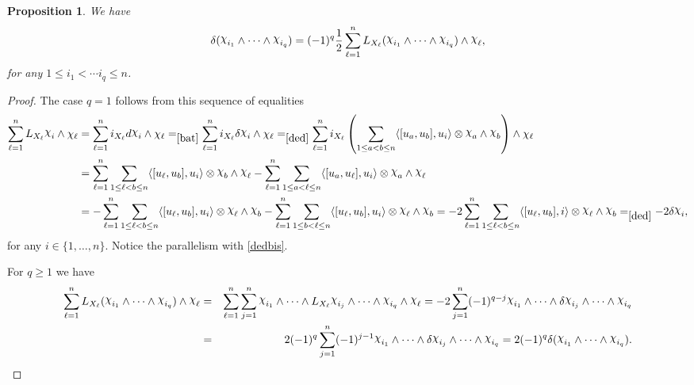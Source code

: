 \documentclass[a4paper,oneside,10pt,reqno]{amsart}
\newtheorem{proposition}[theorem]{Proposition}
\theoremstyle{definition}
\newcommand\chii{\raise2pt\hbox{$\chi$}}
\begin{document}
\begin{proposition}\label{sei}
We have
\begin{equation}\label{seib}
\delta(\chii_{i_1} \wedge \cdots \wedge \chii_{i_q})
 =    (-1)^{q}  \frac {1}  2  \sum_{\ell=1} ^n L_{X_\ell}( \chii_{i_1} \wedge \cdots \wedge \chii_{i_q} ) \wedge \chii_\ell  ,
 \end{equation}
for any $1 \leq i_1 < \cdots i_q \leq n$.
\end{proposition}
\begin{proof}
The case $q=1$ follows from this sequence of equalities
\begin{align*}
\sum_{\ell=1}^n L_{X_{\ell}} \chii_{i}\wedge \chi_{\ell} &=
\sum_{\ell=1}^n i_{X_{\ell}}  d \chii_{i}\wedge \chi_{\ell}=_{\eqref{bat}}
 \sum_{\ell=1}^n i_{X_{\ell}}  \delta \chii_{i}\wedge \chi_{\ell}
=_{\eqref{ded}}
\sum_{\ell=1}^n i_{X_{\ell}}   \left(\sum_{1\leq a <b\leq n} \langle [u_a,u_b],u_i\rangle \otimes \chii_{a} \wedge \chii_{b} \right) \wedge \chi_{\ell}\\
&=
\sum_{\ell=1}^n  \sum_{1\leq \ell  <b\leq n} \langle [u_\ell ,u_b],u_i\rangle \otimes \chii_{b}  \wedge \chii_{\ell}
-
\sum_{\ell=1}^n   \sum_{1\leq a <\ell \leq n} \langle [u_a,u_\ell],u_i\rangle \otimes \chii_{a}  \wedge \chii_{\ell}
\\
&=
- \sum_{\ell=1}^n  \sum_{1\leq \ell  <b\leq n} \langle [u_\ell ,u_b],u_i\rangle \otimes \chii_{\ell}  \wedge \chii_{b}
-
\sum_{\ell=1}^n   \sum_{1\leq b <\ell \leq n} \langle [u_\ell,u_b],u_i\rangle \otimes \chii_{\ell}  \wedge \chii_{b}
=
- 2\sum_{\ell=1}^n  \sum_{1\leq \ell  <b\leq n} \langle [u_\ell ,u_b],i\rangle \otimes \chii_{\ell}  \wedge \chii_{b}
=_{\eqref{ded}}
-2\delta \chii_{i},
\end{align*}
for any $i \in \{1, \ldots,n\}$. Notice the parallelism with  \eqref{dedbis}.

For  $q\geq 1$ we have 
 \begin{eqnarray*}
 \sum_{\ell=1} ^n L_{X_\ell}( \chii_{i_1} \wedge \cdots \wedge \chii_{i_q} ) \wedge \chii_\ell  
 &=&
  \sum_{\ell=1} ^n \sum_{j=1}^n   \chii_{i_1} \wedge \cdots  \wedge L_{X_\ell} \chii_{i_j} \wedge \cdots \wedge \chii_{i_q}  \wedge \chii_\ell  = -2  \sum_{j=1} ^n (-1)^{q -j} \chii_{i_1} \wedge \cdots  \wedge  \delta \chii_{i_j}  \wedge \cdots \wedge \chii_{i_q} 
   \\& =&
 2  (-1)^{q }  \sum_{j=1} ^n (-1)^{j-1} \chii_{i_1} \wedge \cdots  \wedge    \delta \chii_{i_j}  \wedge \cdots \wedge \chii_{i_q} 
=
  2 (-1)^{q} \delta(\chii_{i_1} \wedge \cdots \wedge \chii_{i_q}). \qedhere
   \end{eqnarray*} \qedhere
\end{proof}
\end{document}
